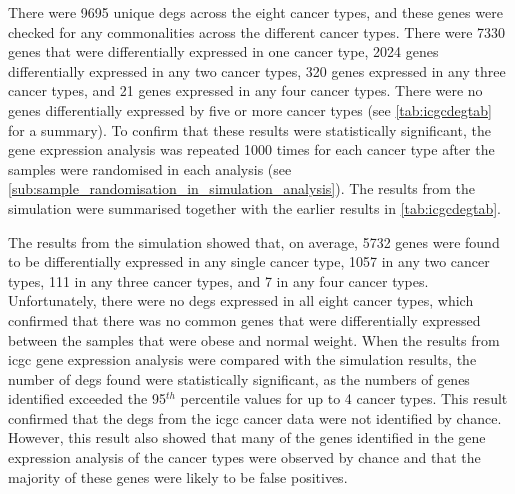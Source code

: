 There were 9695 unique \glspl{deg} across the eight cancer types, and these genes were checked for any commonalities across the different cancer types.
There were 7330 genes that were differentially expressed in one cancer type, 2024 genes differentially expressed in any two cancer types, 320 genes expressed in any three cancer types, and 21 genes expressed in any four cancer types.
There were no genes differentially expressed by five or more cancer types (see \cref{tab:icgcdegtab} for a summary).
To confirm that these results were statistically significant, the gene expression analysis was repeated 1000 times for each cancer type after the samples were randomised in each analysis (see \cref{sub:sample_randomisation_in_simulation_analysis}).
The results from the simulation were summarised together with the earlier results in \cref{tab:icgcdegtab}.

The results from the simulation showed that, on average, 5732 genes were found to be differentially expressed in any single cancer type, 1057 in any two cancer types, 111 in any three cancer types, and 7 in any four cancer types.
Unfortunately, there were no \glspl{deg} expressed in all eight cancer types, which confirmed that there was no common genes that were differentially expressed between the samples that were obese and normal weight.
When the results from \gls{icgc} gene expression analysis were compared with the simulation results, the number of \glspl{deg} found were statistically significant, as the numbers of genes identified exceeded the 95$^{th}$ percentile values for up to 4 cancer types.
This result confirmed that the \glspl{deg} from the \gls{icgc} cancer data were not identified by chance.
However, this result also showed that many of the genes identified in the gene expression analysis of the cancer types were observed by chance and that the majority of these genes were likely to be false positives.

